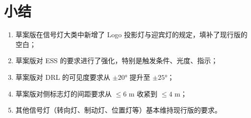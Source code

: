 \section{小结}

\begin{enumerate}[leftmargin=2em]
    \item 草案版在信号灯大类中新增了 Logo 投影灯与迎宾灯的规定，填补了现行版的空白；
    \item 草案版对 ESS 的要求进行了强化，特别是触发条件、光度、指示；
    \item 草案版对 DRL 的可见度要求从 $\pm 20°$ 提升至 $\pm 25°$；
    \item 草案版对侧标志灯的间距要求从 $\le 6$ m 收紧到 $\le 4$ m；
    \item 其他信号灯（转向灯、制动灯、位置灯等）基本维持现行版的要求。
\end{enumerate}